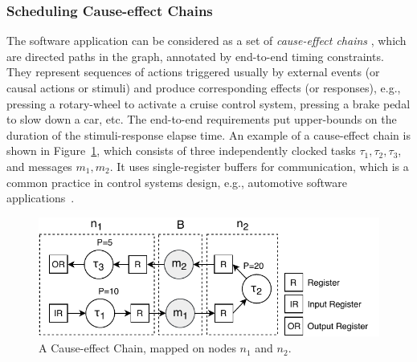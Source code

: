 \subsubsection{Scheduling Cause-effect Chains}\label{subsec_causeeffectchains}
The software application can be considered as a set of \textit{cause-effect chains} \sexpsp{\Gamma}{\Gamma}, which are  directed paths in the graph, annotated by end-to-end timing constraints. They represent sequences of actions triggered usually by external events (or causal actions or stimuli) and produce corresponding effects (or responses), e.g.,  pressing a rotary-wheel to activate a cruise control system, pressing a brake pedal to slow down a car, etc. The end-to-end requirements put upper-bounds on the duration of the stimuli-response elapse time. An example of a cause-effect chain is shown in Figure~\ref{fig_causeeffectchainntk}, which consists of three independently clocked tasks $\tau_1,\tau_2,\tau_3$, and messages $m_1,m_2$. It uses single-register buffers for communication, which is a common practice in control systems design, e.g., automotive software applications~\cite{Becker2017End-to-endSystems}.
\begin{figure}
	\centering
	\includegraphics[width=0.7\linewidth]{img/cause_effect_chain_ntk}
	\caption{A Cause-effect Chain, mapped on nodes $n_1$ and $n_2$.}
	\label{fig_causeeffectchainntk}
\end{figure}

